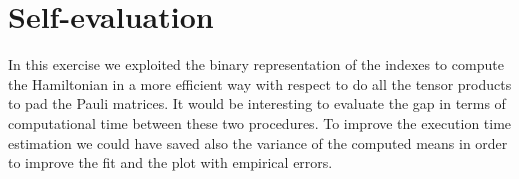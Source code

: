 \documentclass[11pt,a4paper]{article}
\begin{document}
\section{Self-evaluation} %

In this exercise we exploited the binary representation of the indexes to compute the Hamiltonian in a more efficient way with respect to do all the tensor products to pad the Pauli matrices. It would be interesting to evaluate the gap in terms of computational time between these two procedures.
To improve the execution time estimation we could have saved also the variance of the computed means in order to improve the fit and the plot with empirical errors.

	
\end{document}
